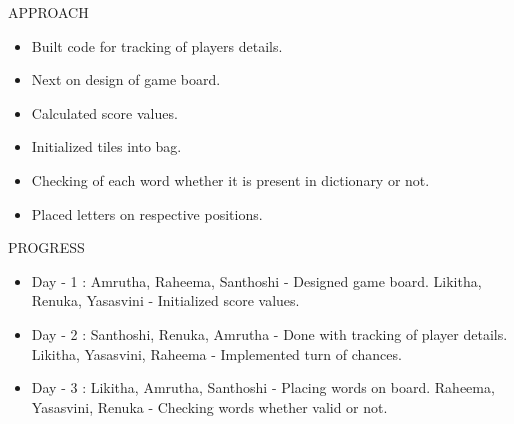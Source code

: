 \documentclass[13.5pt]{beamer}
\begin{document}
\begin{frame}{APPROACH}

\begin{itemize}

\item Built code for tracking of players details.

\item Next on design of game board.

\item Calculated score values.

\item Initialized tiles into bag.

\item Checking of each word whether it is present in dictionary or not.

\item Placed letters on respective positions.


\end{itemize}

\end{frame}

\begin{frame}{PROGRESS}

\begin{itemize}
    \item Day - 1 : \hspace{10cm}
    Amrutha, Raheema, Santhoshi - Designed  game board. Likitha, Renuka, Yasasvini \hspace{0.5cm} -  Initialized score values.
    \item Day - 2 : \hspace{10cm}
    Santhoshi, Renuka, Amrutha \hspace{0.07cm} - Done with tracking of  player details. \hspace{10cm}
    Likitha, Yasasvini, Raheema \hspace{0.1cm} - Implemented turn of  chances.
    \item Day - 3 : \hspace{10cm}
    Likitha, Amrutha, Santhoshi \hspace{0.07cm} - Placing words on board. \hspace{6cm}
    Raheema, Yasasvini, Renuka \hspace{0.07cm} - Checking words whether valid or not.
    
\end{itemize}
    
\end{frame}
\end{document}

